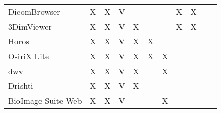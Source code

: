 \begin{table}[H]
\begin{tabular}{lllllllllll}
DicomBrowser \cite{Archie2012} & X & X & V &  &  &  & X & X &  &  \\
3DimViewer \cite{TESCAN2020} & X & X & V & X &  &  & X & X &  &  \\
Horos \cite{horosproject2020} & X & X & V & X & X &  &  &  &  &  \\
OsiriX Lite \cite{PixmeoSARL2019} & X & X & V & X & X & X &  &  &  &  \\
dwv \cite{Martelli2021} & X & X & V & X &  & X &  &  &  &  \\
Drishti \cite{Limaye2012} & X & X & V & X &  &  &  &  &  &  \\
BioImage Suite Web \cite{Papademetris2005} & X & X & V &  &  & X &  &  &  &  \\
\end{tabular}
\end{table}

